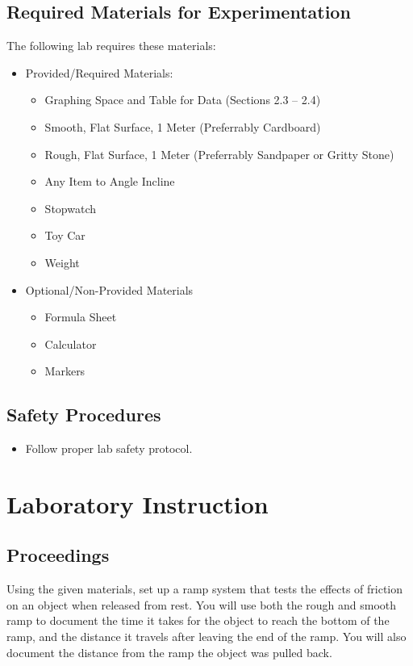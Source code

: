 \documentclass[12pt, letterpaper]{report}
\begin{document}
    \section{Required Materials for Experimentation}
      \noindent The following lab requires these materials:
      \begin{itemize}
        \item{Provided/Required Materials:}
        \begin{itemize}
          \item{Graphing Space and Table for Data (Sections 2.3 -- 2.4)}
          \item{Smooth, Flat Surface, 1 Meter (Preferrably Cardboard)}
          \item{Rough, Flat Surface, 1 Meter (Preferrably Sandpaper or Gritty Stone)}
          \item{Any Item to Angle Incline}
          \item{Stopwatch}
          \item{Toy Car}
          \item{Weight}
        \end{itemize}
        \item{Optional/Non-Provided Materials}
          \begin{itemize}
            \item{Formula Sheet}
            \item{Calculator}
            \item{Markers}
          \end{itemize}
      \end{itemize}
    \section{Safety Procedures}
      \begin{itemize}
        \item{Follow proper lab safety protocol.}
      \end{itemize}
\pagebreak
  \chapter{Laboratory Instruction}
    \section{Proceedings}
      \par Using the given materials, set up a ramp system that tests the effects of friction on an object when released from rest. You will use both the rough and smooth ramp to document the time it takes for the object to reach the bottom of the ramp, and the distance it travels after leaving the end of the ramp. You will also document the distance from the ramp the object was pulled back.
\end{document}
